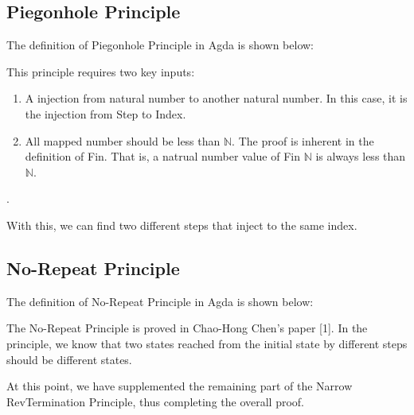 \subsection{ Piegonhole Principle }
The definition of Piegonhole Principle in Agda is shown below:



This principle requires two key inputs:
\begin{enumerate}[1.]
    \item A injection from natural number to another natural number. In this case, it is the injection from Step to Index. 
    \item All mapped number should be less than $\mathbb{N}$.  The proof is inherent in the definition of Fin.  That is, a natrual number value of Fin $\mathbb{N}$ is always less than $\mathbb{N}$.
\end{enumerate}.

With this, we can find two different steps that inject to the same index.

\subsection{ No-Repeat Principle }
The definition of No-Repeat Principle in Agda is shown below:

The No-Repeat Principle is proved in Chao-Hong Chen's paper [1].  
In the principle, we know that two states reached from the initial state by different steps should be different states.


At this point, we have supplemented the remaining part of the Narrow RevTermination Principle, thus completing the overall proof.